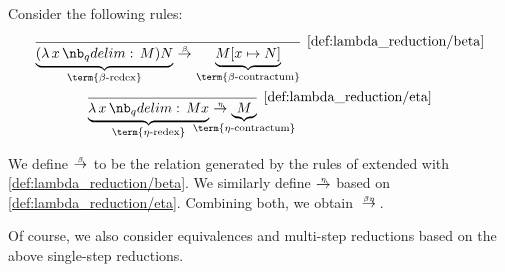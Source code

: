 \begin{definition}\label{def:beta_eta_reduction}
  Consider the following rules:
  \begin{TwoColumns}
    \begin{equation*}\taglabel[\ensuremath{ \logic{Red}_\beta }]{def:lambda_reduction/beta}
      \begin{prooftree}
        \infer0[\ref{def:lambda_reduction/beta}]{ \underbrace{(\qabs x M) N}_{\T{\term{\( \beta \)-redex}}} \bred \underbrace{M[x \mapsto N]}_{\T{\term{\( \beta \)-contractum}}} }.
      \end{prooftree}
    \end{equation*}
  \BeginSecondColumn
    \begin{equation*}\taglabel[\ensuremath{ \logic{Red}_\eta }]{def:lambda_reduction/eta}
      \begin{prooftree}
        \infer0[\ref{def:lambda_reduction/eta}]{ \underbrace{\qabs x M x}_{\T{\term{\( \eta \)-redex}}} \ered \underbrace{M}_{\mathclap{\T{\term{\( \eta \)-contractum}}}} }.
      \end{prooftree}
    \end{equation*}
  \end{TwoColumns}

  We define  \( {\bred} \) to be the relation generated by the rules of  extended with \ref{def:lambda_reduction/beta}. We similarly define  \( {\ered} \) based on \ref{def:lambda_reduction/eta}. Combining both, we obtain  \( {\bered} \).
\end{definition}
\begin{comments}
  \item Of course, we also consider equivalences and multi-step reductions based on the above single-step reductions.
\end{comments}

